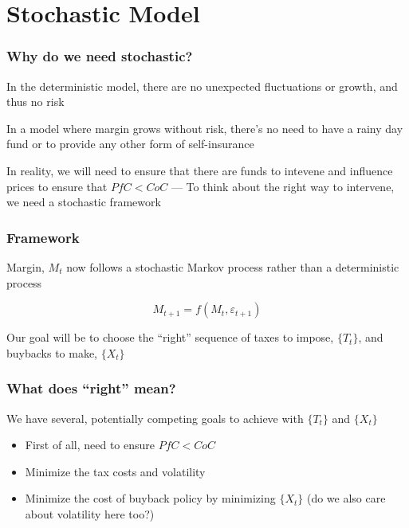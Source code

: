 \documentclass[10pt]{beamer}
\begin{document}
\section{Stochastic Model}

  \begin{frame} \frametitle{Why do we need stochastic?}

    In the deterministic model, there are no unexpected fluctuations or growth, and thus no risk

    In a model where margin grows without risk, there's no need to have a rainy day fund or to
    provide any other form of self-insurance

    In reality, we will need to ensure that there are funds to intevene and influence prices to
    ensure that $PfC < CoC$ --- To think about the right way to intervene, we need a stochastic
    framework

  \end{frame}

  \begin{frame} \frametitle{Framework}

    Margin, $M_t$ now follows a stochastic Markov process rather than a deterministic process

    $$M_{t+1} = f(M_t, \varepsilon_{t+1})$$

    Our goal will be to choose the ``right'' sequence of taxes to impose, $\{T_t\}$, and buybacks to
    make, $\{X_t\}$

  \end{frame}

  \begin{frame} \frametitle{What does ``right'' mean?}

    We have several, potentially competing goals to achieve with $\{T_t\}$ and $\{X_t\}$

    \vspace{0.25cm}

    \begin{itemize}
      \item First of all, need to ensure $PfC < CoC$
      \item Minimize the tax costs and volatility
      \item Minimize the cost of buyback policy by minimizing $\{X_t\}$ (do we also care about
            volatility here too?)
    \end{itemize}

  \end{frame}
\end{document}
